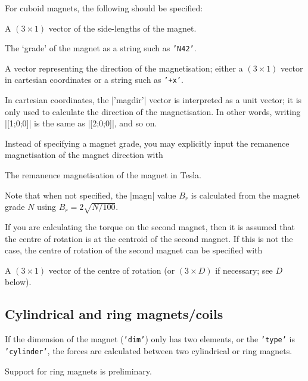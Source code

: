 \documentclass{article}
\begin{document}
For cuboid magnets, the following should be specified:
\begin{description}[noitemsep,font=\ttfamily]
\item['dim'] A $(3\times1)$ vector of the side-lengths of the magnet.
\item['grade'] The `grade' of the magnet as a string such as \texttt{'N42'}.
\item['magdir'] A vector representing the direction of the magnetisation; either a $(3\times1)$ vector in cartesian
                coordinates or a string such as \texttt{'+x'}.
\end{description}
In cartesian coordinates, the |'magdir'| vector is interpreted as a unit vector; it is only used to calculate the direction of the magnetisation.
In other words, writing |[1;0;0]| is the same as |[2;0;0]|, and so on.

Instead of specifying a magnet grade, you may explicitly input the remanence magnetisation
of the magnet direction with
\begin{description}[noitemsep,font=\ttfamily]
\item['magn'] The remanence magnetisation of the magnet in Tesla.
\end{description}
Note that when not specified, the |magn| value $B_r$ is calculated from the magnet grade $N$ using $B_r=2\sqrt{N/100}$.

If you are calculating the torque on the second magnet, then it is assumed that the centre of rotation is at the centroid of the second magnet.
If this is not the case, the centre of rotation of the second magnet can be specified with
\begin{description}[noitemsep,font=\ttfamily]
\item['lever'] A $(3\times1)$ vector of the centre of rotation
(or $(3\times D)$ if necessary; see $D$ below).
\end{description}

\subsection{Cylindrical and ring magnets/coils}

If the dimension of the magnet (\texttt{'dim'}) only has two elements,
or the \texttt{'type'} is \texttt{'cylinder'}, the forces are calculated between two cylindrical or ring magnets.

Support for ring magnets is preliminary.
\end{document}
